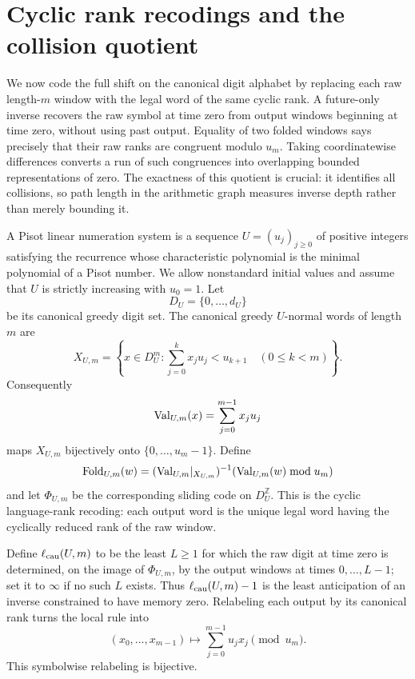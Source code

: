 \section{Cyclic rank recodings and the collision quotient}
\label{sec:cyclic-rank-application}

We now code the full shift on the canonical digit alphabet by replacing each
raw length-$m$ window with the legal word of the same cyclic rank.  A
future-only inverse recovers the raw symbol at time zero from output windows
beginning at time zero, without using past output.  Equality of two folded
windows says precisely that their raw ranks are congruent modulo $u_m$.
Taking coordinatewise differences converts a run of such congruences into
overlapping bounded representations of zero.  The exactness of this quotient
is crucial: it identifies all collisions, so path length in the arithmetic
graph measures inverse depth rather than merely bounding it.

A Pisot linear numeration system is a sequence $U=(u_j)_{j\ge0}$ of positive
integers satisfying the recurrence whose characteristic polynomial is the
minimal polynomial of a Pisot number.  We allow nonstandard initial values
and assume that $U$ is strictly increasing with $u_0=1$.  Let
\[
D_U=\{0,\ldots,d_U\}
\]
be its canonical greedy digit set.  The canonical greedy $U$-normal words of
length $m$ are
\begin{equation}
X_{U,m}=\left\{x\in D_U^m:
 \sum_{j=0}^k x_ju_j<u_{k+1}\quad(0\le k<m)\right\}.
\label{eq:pisot-canonical-words}
\end{equation}
Consequently
\[
\mathrm{Val}_{U,m}(x)=\sum_{j=0}^{m-1}x_ju_j
\]
maps $X_{U,m}$ bijectively onto $\{0,\ldots,u_m-1\}$.  Define
\begin{equation}
\mathrm{Fold}_{U,m}(w)=
(\mathrm{Val}_{U,m}|_{X_{U,m}})^{-1}
       (\mathrm{Val}_{U,m}(w)\bmod u_m)
\label{eq:pisot-canonical-fold}
\end{equation}
and let $\Phi_{U,m}$ be the corresponding sliding code on
$D_U^{\mathbb Z}$.  This is the cyclic language-rank recoding: each output
word is the unique legal word having the cyclically reduced rank of the raw
window.

Define $\ell_{\rm cau}(U,m)$ to be the least $L\ge1$ for which the raw digit
at time zero is determined, on the image of $\Phi_{U,m}$, by the output
windows at times $0,\ldots,L-1$; set it to $\infty$ if no such $L$ exists.
Thus $\ell_{\rm cau}(U,m)-1$ is the least anticipation of an inverse
constrained to have memory zero.  Relabeling each output by its canonical
rank turns the local rule into
\[
(x_0,\ldots,x_{m-1})\longmapsto
\sum_{j=0}^{m-1}u_jx_j\pmod {u_m}.
\]
This symbolwise relabeling is bijective.

